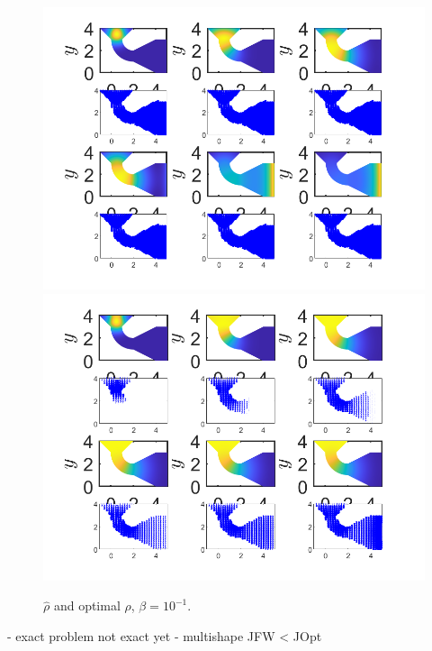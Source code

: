 \documentclass[11pt, a4paper]{article}
\theoremstyle{definition}
\newcommand{\hr}{\widehat \rho}
\begin{document}
\begin{figure}[h]
	\centering
	\includegraphics[scale=0.6]{R1.png}
	\includegraphics[scale=0.6]{R2.png}
	\caption{$\hr$ and optimal $\rho$, $\beta = 10^{-1}$.} 
	\label{F3}
\end{figure}

	- exact problem not exact yet
- multishape JFW < JOpt
\end{document}
